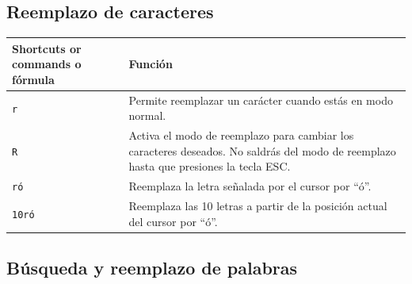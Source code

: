 \documentclass[
  doc,
  floatsintext,
  longtable,
  a4paper,
  nolmodern,
  notxfonts,
  notimes,
  12pt,
  colorlinks=true,linkcolor=blue,citecolor=blue,urlcolor=blue]{apa7}
\newcounter{none} %
\begin{document}
\subsection{Reemplazo de caracteres}\label{reemplazo-de-caracteres}

{\def\LTcaptype{none} %
\begin{longtable}[]{@{}
  >{\raggedright\arraybackslash}p{}
  >{\raggedright\arraybackslash}p{}@{}}
\toprule\noalign{}
\begin{minipage}[b]{\linewidth}\raggedright
Shortcuts or commands o fórmula
\end{minipage} & \begin{minipage}[b]{\linewidth}\raggedright
Función
\end{minipage} \\
\midrule\noalign{}
\endhead
\bottomrule\noalign{}
\endlastfoot
\texttt{r} & Permite reemplazar un carácter cuando estás en modo
normal. \\
\texttt{R} & Activa el modo de reemplazo para cambiar los caracteres
deseados. No saldrás del modo de reemplazo hasta que presiones la tecla
ESC. \\
\texttt{ró} & Reemplaza la letra señalada por el cursor por ``ó''. \\
\texttt{10ró} & Reemplaza las 10 letras a partir de la posición actual
del cursor por ``ó''. \\
\end{longtable}
}

\subsection{Búsqueda y reemplazo de
palabras}\label{buxfasqueda-y-reemplazo-de-palabras}
\end{document}
